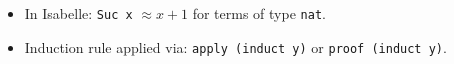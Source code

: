 \documentclass[10pt,a4paper]{article}
\begin{document}
\vspace{0.3em}

\begin{tcolorbox}[title=Isabelle Syntax Reminder]
\begin{itemize}[leftmargin=1.2em, itemsep=2pt]
    \item In Isabelle: \texttt{Suc x} $\approx x + 1$ for terms of type \texttt{nat}.
    \item Induction rule applied via: \texttt{apply (induct y)} or \texttt{proof (induct y)}.
\end{itemize}
\end{tcolorbox}
\end{document}
